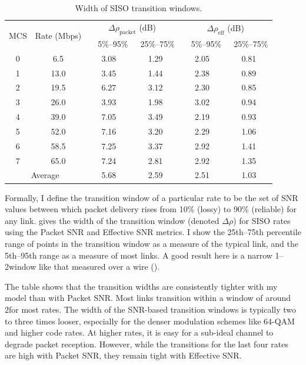 \begin{table}
\centering
\begin{tabular}{cccccc}
\toprule
\multirow{2}{*}{MCS} & \multirow{2}{*}{Rate (Mbps)} & \multicolumn{2}{c}{$\Delta\rho_{\text{packet}}$ (dB)} &
\multicolumn{2}{c}{$\Delta\rho_{\text{eff}}$ (dB)} \\ 
\cmidrule(lr){3-4} \cmidrule(lr){5-6}
& &  ~~5\%--95\% & ~25\%--75\% & ~~5\%--95\% & ~25\%--75\%  \\
\midrule 
0 &  6.5                    & 3.08  & 1.29  & 2.05  & 0.81 \\
1 & 13.0                    & 3.45  & 1.44  & 2.38  & 0.89 \\
2 & 19.5                    & 6.27  & 3.12  & 2.30  & 0.85 \\
3 & 26.0                    & 3.93  & 1.98  & 3.02  & 0.94 \\
4 & 39.0                    & 7.05  & 3.49  & 2.19  & 0.93 \\
5 & 52.0                    & 7.16  & 3.20  & 2.29  & 1.06 \\
6 & 58.5                    & 7.25  & 3.37  & 2.92  & 1.41 \\
7 & 65.0                    & 7.24  & 2.81  & 2.92  & 1.35 \\
\midrule
\multicolumn{2}{c}{Average} & 5.68  & 2.59  & 2.51  & 1.03 \\         
\bottomrule
\end{tabular}
\caption[Width of SISO transition windows]{\label{tab:transitions} Width of SISO transition windows.}
\end{table}

Formally, I define the transition window of a particular rate to be the set of SNR values between which packet delivery rises from 10\% (lossy) to 90\% (reliable) for any link.  gives the width of the transition window (denoted $\Delta\rho$) for SISO rates using the Packet SNR and Effective SNR metrics. I show the 25th--75th percentile range of points in the transition window as a measure of the typical link, and the 5th--95th range as a measure of most links. A good result here is a narrow 1\dB--2\dB window like that measured over a wire ().

The table shows that the transition widths are consistently tighter with my model than with Packet SNR. Most links transition within a window of around 2\dB for most rates. The width of the SNR-based transition windows is typically two to three times looser, especially for the denser modulation schemes like 64-QAM and higher code rates. At higher rates, it is easy for a sub-ideal channel to degrade packet reception. However, while the transitions for the last four rates are high with Packet SNR, they remain tight with Effective SNR.

